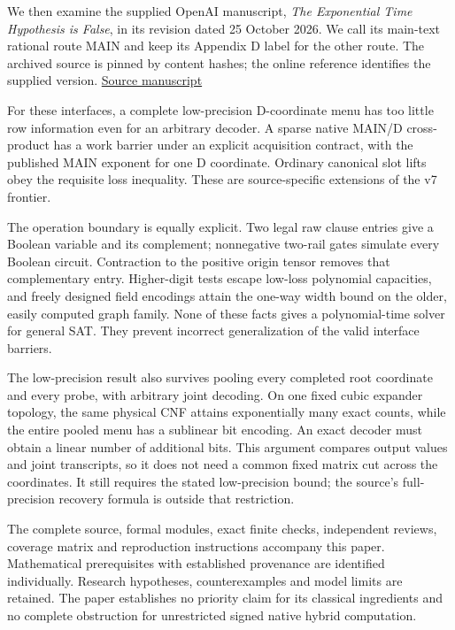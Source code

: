 \documentclass[11pt,a4paper]{article}
\begin{document}
We then examine the supplied OpenAI manuscript, \emph{The Exponential
Time Hypothesis is False}, in its revision dated 25 October 2026. We
call its main-text rational route MAIN and keep its Appendix D label for
the other route. The archived source is pinned by content hashes; the
online reference identifies the supplied version.
\href{https://github.com/openai/math/tree/main/preprints/The-Exponential-Time-Hypothesis-is-False-October-25-2026}{Source
manuscript}

For these interfaces, a complete low-precision D-coordinate menu has too
little row information even for an arbitrary decoder. A sparse native
MAIN/D cross-product has a work barrier under an explicit acquisition
contract, with the published MAIN exponent for one D coordinate.
Ordinary canonical slot lifts obey the requisite loss inequality. These
are source-specific extensions of the v7 frontier.

The operation boundary is equally explicit. Two legal raw clause entries
give a Boolean variable and its complement; nonnegative two-rail gates
simulate every Boolean circuit. Contraction to the positive origin
tensor removes that complementary entry. Higher-digit tests escape
low-loss polynomial capacities, and freely designed field encodings
attain the one-way width bound on the older, easily computed graph
family. None of these facts gives a polynomial-time solver for general
SAT. They prevent incorrect generalization of the valid interface
barriers.

The low-precision result also survives pooling every completed root
coordinate and every probe, with arbitrary joint decoding. On one fixed
cubic expander topology, the same physical CNF attains exponentially
many exact counts, while the entire pooled menu has a sublinear bit
encoding. An exact decoder must obtain a linear number of additional
bits. This argument compares output values and joint transcripts, so it
does not need a common fixed matrix cut across the coordinates. It still
requires the stated low-precision bound; the source's full-precision
recovery formula is outside that restriction.

The complete source, formal modules, exact finite checks, independent
reviews, coverage matrix and reproduction instructions accompany this
paper. Mathematical prerequisites with established provenance are
identified individually. Research hypotheses, counterexamples and model
limits are retained. The paper establishes no priority claim for its
classical ingredients and no complete obstruction for unrestricted
signed native hybrid computation.
\end{document}

